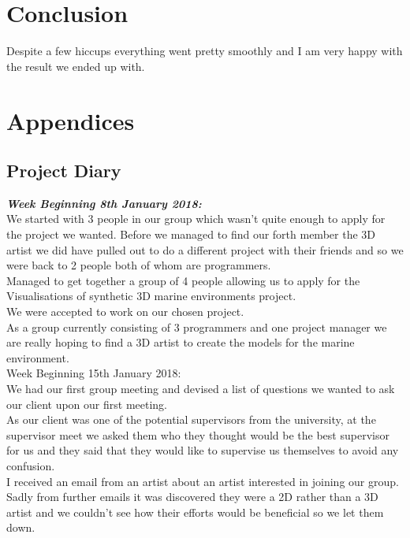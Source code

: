 \documentclass[10pt, a4paper]{article}
\begin{document}
	\section{Conclusion}
	Despite a few hiccups everything went pretty smoothly and I am very happy with the result we ended up with.
    
    \section{Appendices}
    \subsection{Project Diary}
    \textbf{\textit{Week Beginning 8th January 2018:}}\\
    We started with 3 people in our group which wasn't quite enough to apply for the project we wanted. Before we managed to find our forth member the 3D artist we did have pulled out to do a different project with their friends and so we were back to 2 people both of whom are programmers.\\
    
    Managed to get together a group of 4 people allowing us to apply for the Visualisations of synthetic 3D marine environments project.\\
    
    We were accepted to work on our chosen project.\\
    
    As a group currently consisting of 3 programmers and one project manager we are really hoping to find a 3D artist to create the models for the marine environment.\\
    
    Week Beginning 15th January 2018:\\
    We had our first group meeting and devised a list of questions we wanted to ask our client upon our first meeting.\\
    
    As our client was one of the potential supervisors from the university, at the supervisor meet we asked them who they thought would be the best supervisor for us and they said that they would like to supervise us themselves to avoid any confusion.\\
    
    I received an email from an artist about an artist interested in joining our group. Sadly from further emails it was discovered they were a 2D rather than a 3D artist and we couldn't see how their efforts would be beneficial so we let them down.\\
    
\end{document}
